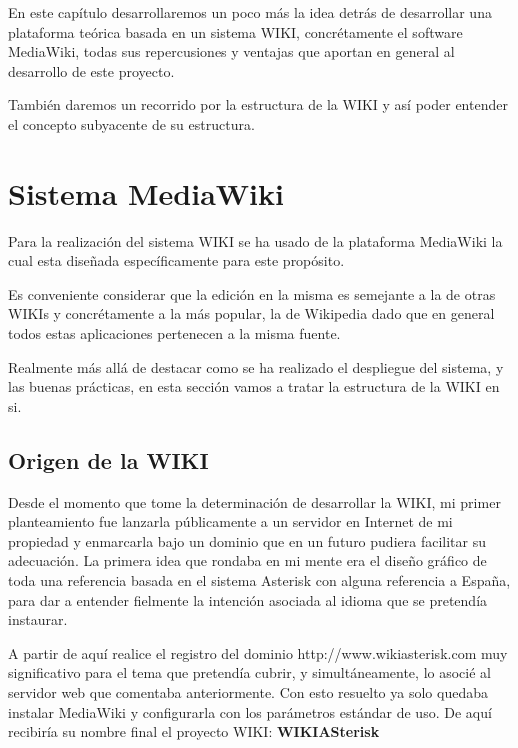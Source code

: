 
En este capítulo desarrollaremos un poco más la idea detrás de desarrollar una plataforma teórica basada en un sistema WIKI, concrétamente el software MediaWiki, todas sus repercusiones y ventajas que aportan en general al desarrollo de este proyecto.

También daremos un recorrido por la estructura de la WIKI y así poder entender el concepto subyacente de su estructura.

\section{Sistema MediaWiki}

Para la realización del sistema WIKI se ha usado de la plataforma MediaWiki \cite{website:mediawiki} la cual esta diseñada específicamente para este propósito.

Es conveniente considerar que la edición en la misma es semejante a la de otras WIKIs y concrétamente a la más popular, la de Wikipedia dado que en general todos estas aplicaciones pertenecen a la misma fuente.

Realmente más allá de destacar como se ha realizado el despliegue del sistema, y las buenas prácticas, en esta sección vamos a tratar la estructura de la WIKI en si.

\subsection{Origen de la WIKI}

Desde el momento que tome la determinación de desarrollar la WIKI, mi primer planteamiento fue lanzarla públicamente a un servidor en Internet de mi propiedad y enmarcarla bajo un dominio que en un futuro pudiera facilitar su adecuación. La primera idea que rondaba en mi mente era el diseño gráfico de toda una referencia basada en el sistema Asterisk con alguna referencia a España, para dar a entender fielmente la intención asociada al idioma que se pretendía instaurar.

A partir de aquí realice el registro del dominio http://www.wikiasterisk.com muy significativo para el tema que pretendía cubrir, y simultáneamente, lo asocié al servidor web que comentaba anteriormente. Con esto resuelto ya solo quedaba instalar MediaWiki y configurarla con los parámetros estándar de uso. De aquí recibiría su nombre final el proyecto WIKI: \textbf{WIKIASterisk}

